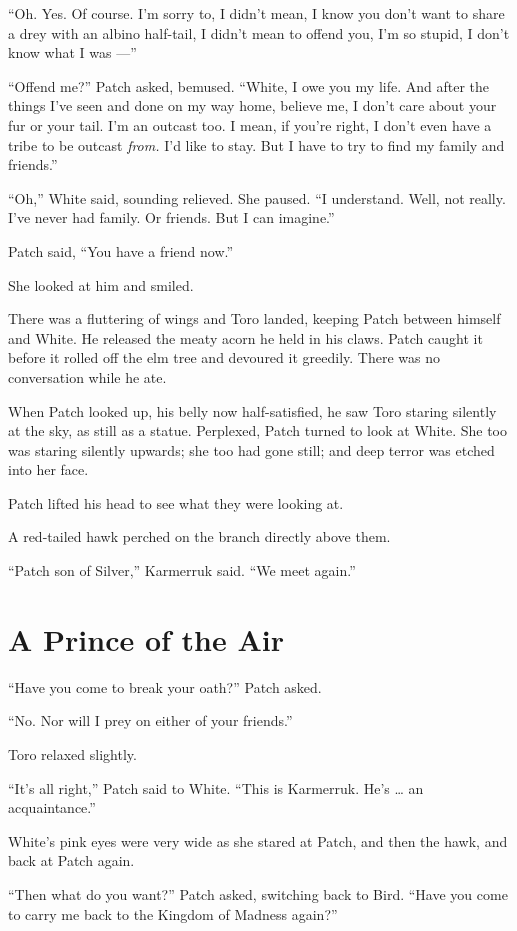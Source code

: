 \documentclass[ebook,oneside,openany,17pt]{memoir}
\newenvironment{tolerant}[1]{%
  \par\tolerance=#1\relax
}{%
  \par
}
\renewcommand{\thechapter}{\Roman{chapter}}
\newcounter{sections}
\newcommand{\sections}[1]{%
  \section*{#1}
  \addtocounter{sections}{1}%
  \pdfbookmark[1]{#1}{section.\thechapter.\thesections}}
\begin{document}
“Oh. Yes. Of course. I’m sorry to, I didn’t mean, I know you don’t
want to share a drey with an albino half-tail, I didn’t mean to offend
you, I’m so stupid, I don’t know what I was —”

“Offend me?” Patch asked, bemused. “White, I owe you my life. And
after the things I’ve seen and done on my way home, believe me, I
don’t care about your fur or your tail. I’m an outcast too. I mean, if
you’re right, I don’t even have a tribe to be outcast \emph{from.}
I’d like to stay. But I have to try to find my family and friends.”

“Oh,” White said, sounding relieved. She paused. “I understand. Well,
not really. I’ve never had family. Or friends. But I can imagine.”

Patch said, “You have a friend now.”

She looked at him and smiled.

There was a fluttering of wings and Toro landed, keeping Patch between
himself and White. He released the meaty acorn he held in his
claws. Patch caught it before it rolled off the elm tree and devoured
it greedily. There was no conversation while he ate.

\begin{tolerant}{5000}
When Patch looked up, his belly now half-satisfied, he saw Toro
staring silently at the sky, as still as a statue. Perplexed, Patch
turned to look at White. She too was staring silently upwards; she too
had gone still; and deep terror was etched into her face.
\end{tolerant}

Patch lifted his head to see what they were looking at.

A red-tailed hawk perched on the branch directly above them.

“Patch son of Silver,” Karmerruk said. “We meet again.”


\sections{A Prince of the Air}

“Have you come to break your oath?” Patch asked.

“No. Nor will I prey on either of your friends.”

Toro relaxed slightly.

“It’s all right,” Patch said to White. “This is Karmerruk. He’s … an
acquaintance.”

White’s pink eyes were very wide as she stared at Patch, and then the
hawk, and back at Patch again.

“Then what do you want?” Patch asked, switching back to Bird. “Have
you come to carry me back to the Kingdom of Madness again?”
\end{document}
